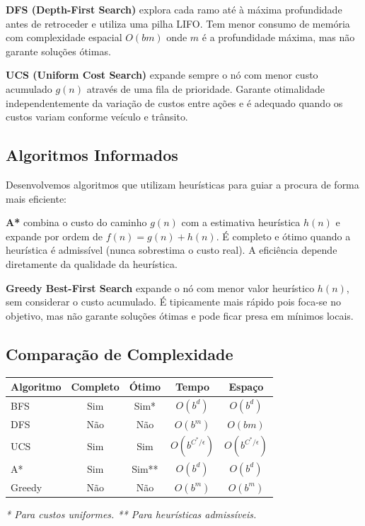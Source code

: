 \documentclass[11pt,a4paper]{article}
\begin{document}
\textbf{DFS (Depth-First Search)} explora cada ramo até à máxima profundidade antes de retroceder e utiliza uma pilha LIFO. Tem menor consumo de memória com complexidade espacial $O(bm)$ onde $m$ é a profundidade máxima, mas não garante soluções ótimas.

\textbf{UCS (Uniform Cost Search)} expande sempre o nó com menor custo acumulado $g(n)$ através de uma fila de prioridade. Garante otimalidade independentemente da variação de custos entre ações e é adequado quando os custos variam conforme veículo e trânsito.

\subsection{Algoritmos Informados}

Desenvolvemos algoritmos que utilizam heurísticas para guiar a procura de forma mais eficiente:

\textbf{A*} combina o custo do caminho $g(n)$ com a estimativa heurística $h(n)$ e expande por ordem de $f(n) = g(n) + h(n)$. É completo e ótimo quando a heurística é admissível (nunca sobrestima o custo real). A eficiência depende diretamente da qualidade da heurística.

\textbf{Greedy Best-First Search} expande o nó com menor valor heurístico $h(n)$, sem considerar o custo acumulado. É tipicamente mais rápido pois foca-se no objetivo, mas não garante soluções ótimas e pode ficar presa em mínimos locais.

\subsection{Comparação de Complexidade}

\begin{center}
\begin{tabular}{|l|c|c|c|c|}
\hline
\textbf{Algoritmo} & \textbf{Completo} & \textbf{Ótimo} & \textbf{Tempo} & \textbf{Espaço} \\
\hline
BFS & Sim & Sim* & $O(b^d)$ & $O(b^d)$ \\
DFS & Não & Não & $O(b^m)$ & $O(bm)$ \\
UCS & Sim & Sim & $O(b^{C^*/\epsilon})$ & $O(b^{C^*/\epsilon})$ \\
A* & Sim & Sim** & $O(b^d)$ & $O(b^d)$ \\
Greedy & Não & Não & $O(b^m)$ & $O(b^m)$ \\
\hline
\end{tabular}
\end{center}
\textit{* Para custos uniformes. ** Para heurísticas admissíveis.}
\end{document}
